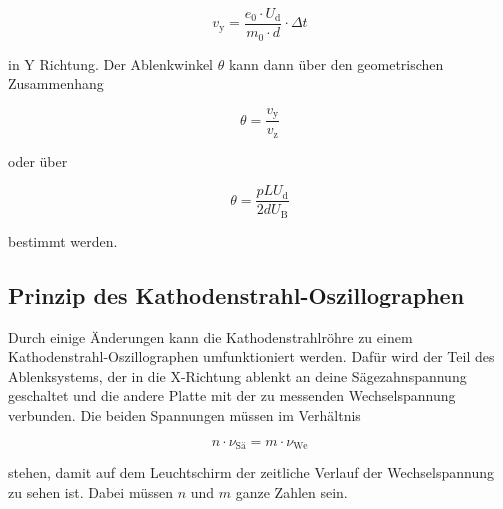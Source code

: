 \begin{equation}
    v_\text{y} = \frac{e_0 \cdot U_\text{d}}{m_0 \cdot d} \cdot \Delta t
    \label{eq:yges}
\end{equation}

in Y Richtung.
Der Ablenkwinkel $\theta$ kann dann über den geometrischen Zusammenhang

\begin{equation}
    \theta = \frac{v_\text{y}}{v_\text{z}}
    \label{eq:theta1}
\end{equation}

oder über 

\begin{equation}
    \theta = \frac{p L U_\text{d}}{2 d U_\text{B}}
    \label{eq:theta2}
\end{equation}

bestimmt werden.

\subsection{Prinzip des Kathodenstrahl-Oszillographen}
\label{ssec:t3}

Durch einige Änderungen kann die Kathodenstrahlröhre zu einem Kathodenstrahl-Oszillographen umfunktioniert werden.
Dafür wird der Teil des Ablenksystems, der in die X-Richtung ablenkt an deine Sägezahnspannung geschaltet und die andere Platte mit der zu messenden Wechselspannung verbunden.
Die beiden Spannungen müssen im Verhältnis 

\begin{equation}
n \cdot \nu _\text{Sä} = m \cdot \nu _\text{We}
    \label{eq:verh}
\end{equation}

stehen, damit auf dem Leuchtschirm der zeitliche Verlauf der Wechselspannung zu sehen ist.
Dabei müssen $n$ und $m$ ganze Zahlen sein.